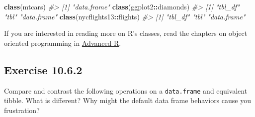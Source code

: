 \documentclass[]{book}
\newenvironment{Shaded}{\begin{snugshade}}{\end{snugshade}}
\newcommand{\CommentTok}[1]{\textcolor[rgb]{0.56,0.35,0.01}{\textit{#1}}}
\newcommand{\DataTypeTok}[1]{\textcolor[rgb]{0.13,0.29,0.53}{#1}}
\newcommand{\DecValTok}[1]{\textcolor[rgb]{0.00,0.00,0.81}{#1}}
\newcommand{\KeywordTok}[1]{\textcolor[rgb]{0.13,0.29,0.53}{\textbf{#1}}}
\newcommand{\NormalTok}[1]{#1}
\newcommand{\OperatorTok}[1]{\textcolor[rgb]{0.81,0.36,0.00}{\textbf{#1}}}
\newcommand{\StringTok}[1]{\textcolor[rgb]{0.31,0.60,0.02}{#1}}
\theoremstyle{plain}
\theoremstyle{remark}
\begin{document}
\begin{Shaded}
\begin{Highlighting}[]
\KeywordTok{class}\NormalTok{(mtcars)}
\CommentTok{#> [1] "data.frame"}
\KeywordTok{class}\NormalTok{(ggplot2}\OperatorTok{::}\NormalTok{diamonds)}
\CommentTok{#> [1] "tbl_df"     "tbl"        "data.frame"}
\KeywordTok{class}\NormalTok{(nycflights13}\OperatorTok{::}\NormalTok{flights)}
\CommentTok{#> [1] "tbl_df"     "tbl"        "data.frame"}
\end{Highlighting}
\end{Shaded}

If you are interested in reading more on R's classes, read the chapters on
object oriented programming in \href{http://adv-r.had.co.nz/S3.html}{Advanced R}.

\hypertarget{exercise-10.6.2}{%
\subsection*{\texorpdfstring{Exercise {10.6.2}}{Exercise 10.6.2}}\label{exercise-10.6.2}}

Compare and contrast the following operations on a \texttt{data.frame} and equivalent tibble. What is different? Why might the default data frame behaviors cause you frustration?

\begin{Shaded}
\end{Shaded}

\begin{Shaded}
\end{Shaded}
\end{document}
